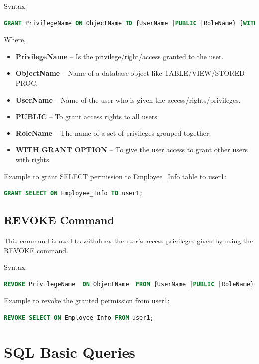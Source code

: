 Syntax:
\begin{lstlisting}[language=sql]
	GRANT PrivilegeName ON ObjectName TO {UserName |PUBLIC |RoleName} [WITH GRANT OPTION];
\end{lstlisting}
Where,
\begin{itemize}
	\tightlist
	\item \textbf{PrivilegeName} – Is the privilege/right/access granted to the user.
	\item \textbf{ObjectName} – Name of a database object like TABLE/VIEW/STORED PROC.
	\item \textbf{UserName} – Name of the user who is given the access/rights/privileges.
	\item \textbf{PUBLIC} – To grant access rights to all users.
	\item \textbf{RoleName} – The name of a set of privileges grouped together.
	\item \textbf{WITH GRANT OPTION} – To give the user access to grant other users with rights.	
\end{itemize}

Example to grant SELECT permission to Employee\_Info table to user1:
\begin{lstlisting}[language=sql]
	GRANT SELECT ON Employee_Info TO user1;
\end{lstlisting}

\section{REVOKE Command}
This command is used to withdraw the user’s access privileges given by using the REVOKE command.

Syntax:
\begin{lstlisting}[language=sql]
	REVOKE PrivilegeName  ON ObjectName  FROM {UserName |PUBLIC |RoleName};
\end{lstlisting}
Example to revoke the granted permission from user1:
\begin{lstlisting}[language=sql]
	REVOKE SELECT ON Employee_Info FROM user1;
\end{lstlisting}



\chapter{SQL Basic Queries}
